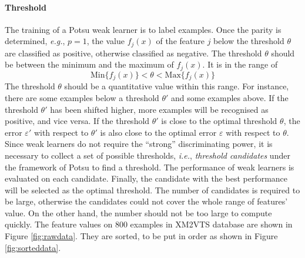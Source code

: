 \paragraph{Threshold}The training of a Potsu weak learner is to label examples. Once the parity is determined, \textit{e.g.}, $p=1$, the value $f_{j}(x)$ of the feature $j$ below the threshold $\theta$ are classified as positive, otherwise classified as negative. The threshold $\theta$ should be between the minimum and the maximum of $f_{j}(x)$. It is in the range of
\begin{equation}
  \mathrm{Min}\{f_{j}(x)\} <\theta < \mathrm{Max}\{f_{j}(x)\}
\end{equation}
The threshold $\theta$ should be a quantitative value within this range. For instance, there are some examples below a threshold $\theta'$ and some examples above. If the threshold $\theta'$ has been shifted higher, more examples will be recognised as positive, and vice versa. If the threshold $\theta'$ is close to the optimal threshold $\theta$, the error $\varepsilon'$ with respect to $\theta'$ is also close to the optimal error $\varepsilon$ with respect to $\theta$. Since weak learners do not require the ``strong'' discriminating power, it is necessary to collect a set of possible thresholds, \textit{i.e.}, \textit{threshold candidates} under the framework of Potsu to find a threshold. The performance of weak learners is evaluated on each candidate. Finally, the candidate with the best performance will be selected as the optimal threshold. The number of candidates is required to be large, otherwise the candidates could not cover the whole range of features' value. On the other hand, the number should not be too large to compute quickly. The feature values on $800$ examples in \mbox{XM2VTS} database are shown in \mbox{Figure} \ref{fig:rawdata}. They are sorted, to be put in order as shown in \mbox{Figure} \ref{fig:sorteddata}.
